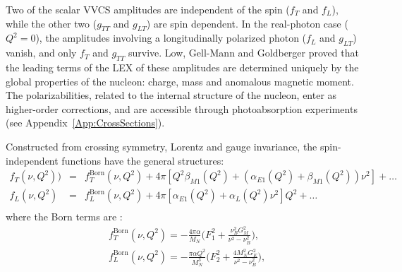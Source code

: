\documentclass[11pt,preprint,tightenlines,
showpacs,preprintnumbers,amsmath,amssymb,superscriptaddress,a4paper,nofootinbib]{revtex4-1}
\def\eqlab#1{\label{eq:#1}}
\begin{document}
Two of the scalar VVCS amplitudes are independent of the spin ($f_T$ and $f_L$), while the other two ($g_{TT}$ and $g_{LT}$) are spin dependent. 
In the real-photon case ($Q^2=0$), the amplitudes involving a longitudinally polarized  photon ($f_L$ and $g_{LT}$) vanish, and only $f_T$ and $g_{TT}$ survive. 
Low, Gell-Mann and Goldberger \cite{ Low:1954kd, Gell_Mann:1954kc} proved that the leading terms of the LEX of these amplitudes are determined uniquely by the global properties of the nucleon: charge, mass and anomalous magnetic moment. 
The polarizabilities, related to the internal structure of the nucleon, enter as higher-order corrections, and are accessible through photoabsorption experiments (see Appendix~\ref{App:CrossSections}).



Constructed from crossing symmetry, Lorentz and gauge invariance, the spin-independent functions have the general structures: 
\begin{subequations}
\eqlab{fgFunctions}
\begin{eqnarray}
  f_T(\nu, Q^2))&=& f_T^{\mathrm{Born}}(\nu, Q^2)+4\pi\left[ Q^2 \beta_{M1}(Q^2) +(\alpha_{E1}(Q^2) + \beta_{M1}(Q^2)) \nu^2\right] + \dots \label{Eq:LEX-fT}\\
  f_L(\nu, Q^2)&=& f_L^{\mathrm{Born}}(\nu, Q^2) + 4 \pi\left[\alpha_{E1}(Q^2)+\alpha_{L}(Q^2) \nu^2\right] Q^2 + \dots \qquad \label{Eq:LEX-fL}\\
\end{eqnarray}
\end{subequations}
where the Born terms are \cite{Drechsel:2002ar}:
\begin{subequations}
\begin{align}
 & f_T^{\mathrm{Born}}(\nu, Q^2) =  - \frac{4\pi \alpha}{M_N} \Big( F_1^2 + \frac{\nu_B^2 G_M^2}{\nu^2-\nu_B^2} \Big), \label{Eq:BT-fT}\\
  &  f_L^{\mathrm{Born}}(\nu, Q^2) = - \frac{\pi \alpha Q^2}{ M_N^3} \Big( F_2^2 + \frac{4M_N^2 G_E^2}{\nu^2-\nu_B^2} \Big), \label{Eq:BT-fL}\\
\end{align}
\end{subequations}
\end{document}
